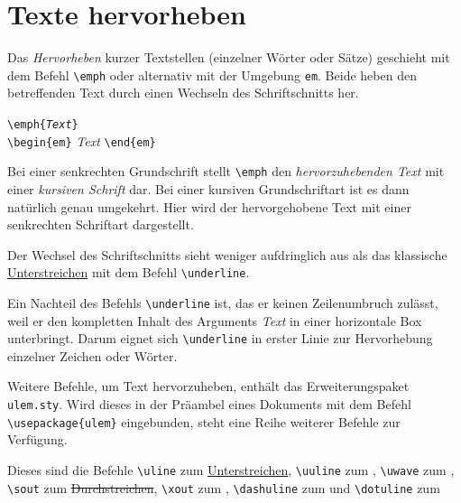 \documentclass[a4paper,10pt,twoside]{scrbook}
\begin{document}
\section{Texte hervorheben}

Das \emph{Hervorheben} kurzer Textstellen (einzelner Wörter oder Sätze) geschieht 
mit dem Befehl \verb!\emph!  
oder alternativ mit der Umgebung \verb!em!. 
Beide heben den betreffenden Text durch einen Wechseln des Schriftschnitts her.

\begin{boxedminipage}{\textwidth}
\texttt{\textbackslash emph\{\textsl{Text}\}}\\
\texttt{\textbackslash begin\{em\}} \enskip \textsl{Text} \enskip \texttt{\textbackslash end\{em\}}
\end{boxedminipage}




Bei einer senkrechten Grundschrift stellt \verb!\emph! den 
\emph{hervorzuhebenden Text} mit einer \textsl{kursiven Schrift} dar. 
Bei einer kursiven Grundschriftart ist es dann natürlich genau 
umgekehrt. Hier wird der hervorgehobene Text mit einer senkrechten 
Schriftart dargestellt.



Der Wechsel des Schriftschnitts sieht weniger aufdringlich aus als das
klassische \underline{Unterstreichen} mit dem Befehl \verb!\underline!.  




Ein Nachteil des Befehls \verb!\underline! ist, das er keinen Zeilenumbruch zulässt, weil er den kompletten Inhalt des Arguments \textsl{Text} in einer horizontale Box unterbringt. Darum eignet sich \verb!\underline! in erster Linie zur Hervorhebung einzelner Zeichen oder Wörter.

Weitere Befehle, um Text hervorzuheben, enthält das Erweiterungspaket \verb!ulem.sty!. 
Wird dieses in der Präambel eines Dokuments mit dem Befehl \verb!\usepackage{ulem}! eingebunden, steht eine Reihe 
weiterer Befehle zur Verfügung.

Dieses sind die Befehle \verb!\uline!  
zum \uline{Unterstreichen}, \verb!\uuline!  
zum , \verb!\uwave!  
zum , \verb!\sout!  
zum \sout{Durchstreichen}, \verb!\xout!  
zum , \verb!\dashuline!  
zum   und \verb!\dotuline!  
zum  
\end{document}
